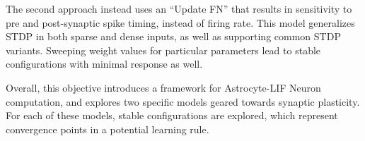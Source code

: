 The second approach instead uses an ``Update FN'' that results in sensitivity to
pre and post-synaptic spike timing, instead of firing rate. This model
generalizes STDP in both sparse and dense inputs, as well as supporting common
STDP variants. Sweeping weight values for particular parameters lead to stable
configurations with minimal \ca response as well.

Overall, this objective introduces a framework for Astrocyte-LIF Neuron
computation, and explores two specific models geared towards synaptic
plasticity. For each of these models, stable configurations are explored, which
represent convergence points in a potential learning rule.
